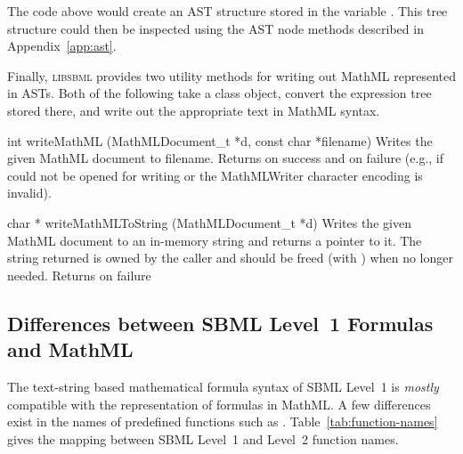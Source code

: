 \documentclass{sbmlmanual}
\newcommand{\libsbml}{\textsc{libsbml}}
\begin{document}
The code above would create an AST structure stored in the variable
.  This tree structure could then be inspected using the AST node
methods described in Appendix~\ref{app:ast}.

Finally, \libsbml{} provides two utility methods for writing out MathML
represented in ASTs.  Both of the following take a
 class object, convert the expression tree stored
there, and write out the appropriate text in MathML syntax.


\begin{methoddef}{int writeMathML (MathMLDocument\_t *d, const char *filename)}
  Writes the given MathML document to filename.  Returns  on
  success and  on failure (e.g., if  could not
  be opened for writing or the MathMLWriter character encoding is invalid).
\end{methoddef}


\begin{methoddef}{char * writeMathMLToString (MathMLDocument\_t *d)}
  Writes the given MathML document to an in-memory string and returns a
  pointer to it.  The string returned is owned by the caller and should be
  freed (with ) when no longer needed.  Returns  on
  failure
\end{methoddef}



\subsection{Differences between SBML Level~1 Formulas and MathML}
\label{sec:function-names}

The text-string based mathematical formula syntax of SBML Level~1 is
\emph{mostly} compatible with the representation of formulas in MathML.  A
few differences exist in the names of predefined functions such as
.  Table~\vref{tab:function-names} gives the mapping
between SBML Level~1 and Level~2 function names.  
\end{document}
